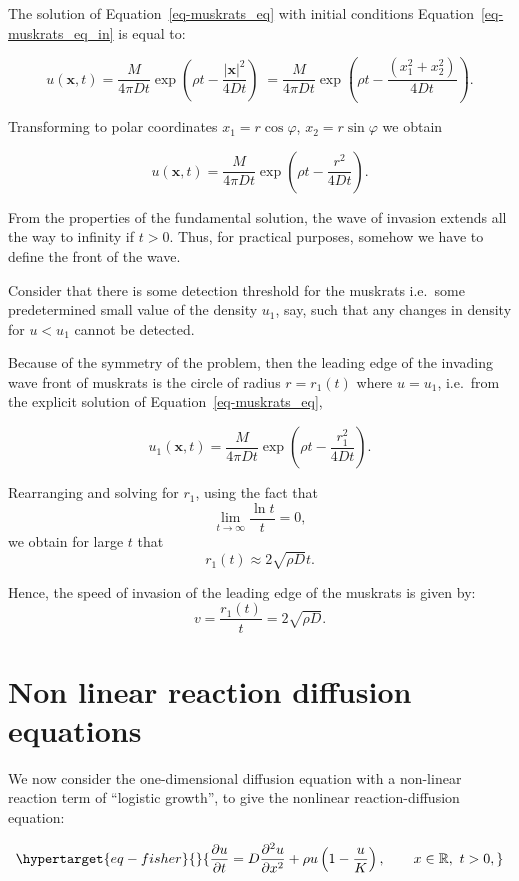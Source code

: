 \documentclass[
  letterpaper,
  DIV=11,
  numbers=noendperiod]{scrreprt}
\theoremstyle{plain}
\theoremstyle{definition}
\theoremstyle{plain}
\theoremstyle{remark}
\begin{document}
The solution of Equation~\ref{eq-muskrats_eq} with initial conditions
Equation~\ref{eq-muskrats_eq_in} is equal to:

\[
u({\mathbf{x}}, t) = \frac M{4 \pi D t} \exp \left(\rho t - \frac{ |{\mathbf{x}} |^2}{ 4Dt} \right)\; = \frac M{4 \pi D t} \exp \left(\rho t - \frac{ (x_{1}^{2} + x_{2}^{2})}{4Dt} \right).
\]

Transforming to polar coordinates \(x_1 = r \cos\varphi\),
\(x_2 = r \sin \varphi\) we obtain

\[
u({\mathbf{x}}, t) = \frac M{4 \pi D t} \exp \left(\rho t - \frac{ r^2}{ 4Dt} \right).
\]

From the properties of the fundamental solution, the wave of invasion
extends all the way to infinity if \(t>0\). Thus, for practical
purposes, somehow we have to define the front of the wave.

Consider that there is some detection threshold for the muskrats
i.e.~some predetermined small value of the density \(u_1\), say, such
that any changes in density for \(u <u_1\) cannot be detected.

Because of the symmetry of the problem, then the leading edge of the
invading wave front of muskrats is the circle of radius \(r=r_1(t)\)
where \(u=u_1\), i.e.~from the explicit solution of
Equation~\ref{eq-muskrats_eq},

\[
u_1({\mathbf{x}}, t) = \frac M{4 \pi D t} \exp \left(\rho t - \frac{ r_1^2}{ 4Dt} \right).
\]

Rearranging and solving for \(r_1\), using the fact that \[
\lim\limits_{t\to \infty} \dfrac {\ln t} t =0, 
\] we obtain for large \(t\) that \[
r_1(t) \approx 2 \sqrt{ \rho D} t.
\]

Hence, the speed of invasion of the leading edge of the muskrats is
given by: \[
v = \frac{r_1(t)}{t} =  2 \sqrt{ \rho D}. 
\]

\hypertarget{non-linear-reaction-diffusion-equations}{%
\chapter{Non linear reaction diffusion
equations}\label{non-linear-reaction-diffusion-equations}}

We now consider the one-dimensional diffusion equation with a non-linear
reaction term of ``logistic growth'', to give the nonlinear
reaction-diffusion equation:

\begin{equation}\protect\hypertarget{eq-fisher}{}{
\frac{\partial u}{\partial t} = D\frac{\partial^2 u}{\partial x^2} +   \rho u\left(1-\frac u K\right), \qquad x\in \mathbb R, \, \, t >0,  
}\label{eq-fisher}\end{equation}
\end{document}
